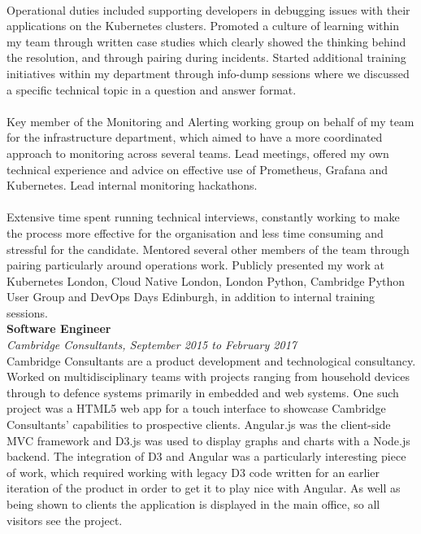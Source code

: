 \documentclass{article}
\begin{document}
\begin{flushleft}
\paragraph{}Operational duties included supporting developers in debugging issues with their applications on the Kubernetes clusters. Promoted a culture of learning within my team through written case studies which clearly showed the thinking behind the resolution, and through pairing during incidents. Started additional training initiatives within my department through info-dump sessions where we discussed a specific technical topic in a question and answer format.

\paragraph{}Key member of the Monitoring and Alerting working group on behalf of my team for the infrastructure department, which aimed to have a more coordinated approach to monitoring across several teams. Lead meetings, offered my own technical experience and advice on effective use of Prometheus, Grafana and Kubernetes. Lead internal monitoring hackathons.

\paragraph{}Extensive time spent running technical interviews, constantly working to make the process more effective for the organisation and less time consuming and stressful for the candidate. Mentored several other members of the team through pairing particularly around operations work. Publicly presented my work at Kubernetes London, Cloud Native London, London Python, Cambridge Python User Group and DevOps Days Edinburgh, in addition to internal training sessions.\\[10pt]

\textbf{Software Engineer}\\
\textit{Cambridge Consultants, September 2015 to February 2017}\\[5pt]
Cambridge Consultants are a product development and technological consultancy. Worked on multidisciplinary teams with projects ranging from household devices through to defence systems primarily in embedded and web systems. One such project was a HTML5 web app for a touch interface to showcase Cambridge Consultants' capabilities to prospective clients. Angular.js was the client-side MVC framework and D3.js was used to display graphs and charts with a Node.js backend. The integration of D3 and Angular was a particularly interesting piece of work, which required working with legacy D3 code written for an earlier iteration of the product in order to get it to play nice with Angular. As well as being shown to clients the application is displayed in the main office, so all visitors see the project.


\end{flushleft}
\end{document}
